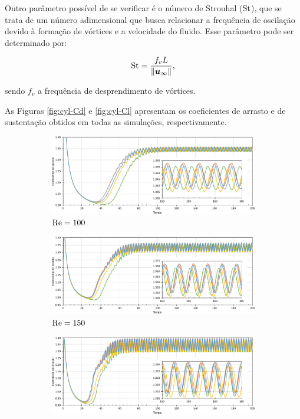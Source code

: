 Outro parâmetro possível de se verificar é o número de Strouhal ($\mathrm{St}$), que se trata de um número adimensional que busca relacionar a frequência de oscilação devido à formação de vórtices e a velocidade do fluido. Esse parâmetro pode ser determinado por:

\begin{equation}
    \mathrm{St}=\frac{f_vL}{\left\lVert{\boldsymbol{u}_\infty}\right\lVert}\text{,}
\end{equation}

\noindent sendo $f_v$ a frequência de desprendimento de vórtices.

As Figuras \ref{fig:cyl-Cd} e \ref{fig:cyl-Cl} apresentam os coeficientes de arrasto e de sustentação obtidos em todas as simulações, respectivamente.

\begin{figure}[h!]
    \centering
    \caption{Escoamento sobre cilindro - Coeficiente de arrasto ao longo do tempo.}
    \begin{subfigure}{\textwidth}
        \includegraphics[width=\linewidth]{Figuras/cylinder/analise3/Cd-100.pdf}
        \caption{$\mathrm{Re}=100$}
    \end{subfigure}
    \begin{subfigure}{\textwidth}
        \includegraphics[width=\linewidth]{Figuras/cylinder/analise3/Cd-150.pdf}
        \caption{$\mathrm{Re}=150$}
    \end{subfigure}
    \begin{subfigure}{\textwidth}
        \includegraphics[width=\linewidth]{Figuras/cylinder/analise3/Cd-200.pdf}

\end{subfigure}
\end{figure}
